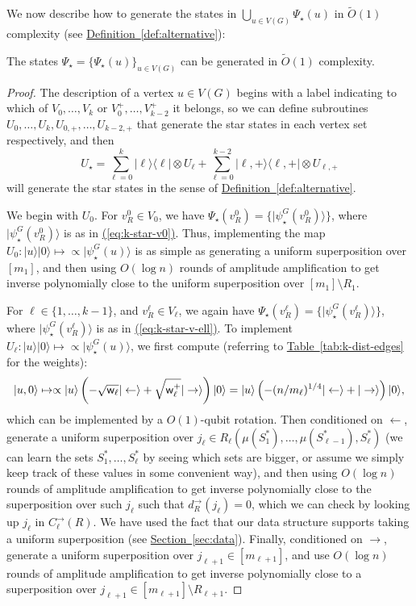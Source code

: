\documentclass{article}
\newcommand{\eq}[1]{\hyperref[eq:#1]{(\ref*{eq:#1})}}
\renewcommand{\sec}[1]{\hyperref[sec:#1]{Section~\ref*{sec:#1}}}
\newcommand{\tabl}[1]{\hyperref[tab:#1]{Table~\ref*{tab:#1}}}
\newcommand{\defin}[1]{\hyperref[def:#1]{Definition~\ref*{def:#1}}}
\def\ket#1{{\lvert}#1\rangle}
\def\bra#1{{\langle}#1\rvert}
\renewcommand{\>}{\rangle}
\newcommand{\<}{\langle}
\renewcommand{\(}{\left(}
\renewcommand{\)}{\right)}
\def\w{{\sf w}}
\begin{document}
\noindent We now describe how to generate the states in $\bigcup_{u\in V(G)}\Psi_\star(u)$ in $\widetilde{O}(1)$ complexity (see \defin{alternative}):
\begin{lemma}\label{lem:k-dist-star-states}
	The states $\Psi_\star=\{\Psi_\star(u)\}_{u\in V(G)}$ can be generated in $\widetilde{O}(1)$ complexity. 
\end{lemma}
\begin{proof}
The description of a vertex $u\in V(G)$ begins with a label indicating to which of $V_0,\dots,V_k$ or $V_0^+,\dots,V_{k-2}^+$ it belongs, so we can define subroutines $U_0,\dots,U_k,U_{0,+},\dots,U_{k-2,+}$ that generate the star states in each vertex set respectively, and then 
$$U_\star = \sum_{\ell=0}^k\ket{\ell}\bra{\ell}\otimes U_{\ell}+\sum_{\ell=0}^{k-2}\ket{\ell,+}\bra{\ell,+}\otimes U_{\ell,+}$$
will generate the star states in the sense of \defin{alternative}. 

	
	We begin with $U_0$. For $v^{0}_{R} \in V_0$, we have $\Psi_\star(v^0_R)=\{\ket{\psi_\star^G(v_R^0)}\}$, where $\ket{\psi_\star^G(v_R^0)}$ is as in \eq{k-star-v0}. Thus, implementing the map $U_0:\ket{u}\ket{0}\mapsto \propto \ket{\psi_\star^G(u)}$ is as simple as generating a uniform superposition over $[m_1]$, and then using $O(\log n)$ rounds of amplitude amplification to get inverse polynomially close to the uniform superposition over $[m_1]\setminus R_1$. 


For $\ell\in\{1,\dots,k-1\}$, and $v^{\ell}_R\in V_{\ell}$, we again have $\Psi_\star(v^\ell_R)=\{\ket{\psi_\star^G(v_R^\ell)}\}$, where $\ket{\psi_\star^G(v_R^\ell)}$ is as in \eq{k-star-v-ell}. To implement $U_{\ell}:\ket{u}\ket{0}\mapsto \propto\ket{\psi_\star^G(u)}$, we first compute (referring to \tabl{k-dist-edges} for the weights):
$$\ket{u,0}\mapsto \propto\ket{u}\left(-\sqrt{\w_{\ell}}\ket{\leftarrow}+\sqrt{\w_{\ell}^+}\ket{\rightarrow}\right)\ket{0}=\ket{u}\left(-(n/m_{\ell})^{1/4}\ket{\leftarrow}+\ket{\rightarrow}\right)\ket{0},$$
which can be implemented by a $O(1)$-qubit rotation. Then conditioned on $\leftarrow$, generate a uniform superposition over $j_{\ell}\in R_{\ell}(\mu(S_1^*),\dots,\mu(S_{\ell-1}^*),S_{\ell}^*)$ (we can learn the sets $S_1^*,\dots,S_{\ell}^*$ by seeing which sets are bigger, or assume we simply keep track of these values in some convenient way), and then using $O(\log n)$ rounds of amplitude amplification to get inverse polynomially close to the superposition over such $j_{\ell}$ such that $d_R^{\rightarrow}(j_{\ell})=0$, which we can check by looking up $j_{\ell}$ in $C_{\ell}^{\rightarrow}(R)$. We have used the fact that our data structure supports taking a uniform superposition (see \sec{data}). Finally, conditioned on $\rightarrow$, generate a uniform superposition over $j_{\ell+1}\in [m_{\ell+1}]$, and use $O(\log n)$ rounds of  amplitude amplification to get inverse polynomially close to a superposition over $j_{\ell+1}\in [m_{\ell+1}]\setminus R_{\ell+1}$.  


\end{proof}
\end{document}
